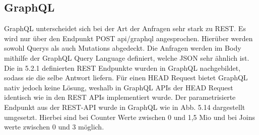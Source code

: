 
\subsection{GraphQL}
GraphQL unterscheidet sich bei der Art der Anfragen sehr stark zu REST. Es wird nur über den Endpunkt POST api/graphql angesprochen. Hierüber werden sowohl Querys als auch Mutations abgedeckt. Die Anfragen werden im Body mithilfe der GraphQL Query Language definiert, welche JSON sehr ähnlich ist. Die in 5.2.1 definierten REST Endpunkte wurden in GraphQL nachgebildet, sodass sie die selbe Antwort liefern. Für einen HEAD Request bietet GraphQL nativ jedoch keine Lösung, weshalb in GraphQL APIs der HEAD Request identisch wie in den REST APIs implementiert wurde.
Der parametrisierte Endpunkt aus der REST-API wurde in GraphQL wie in Abb. 5.14 dargestellt umgesetzt. Hierbei sind bei Counter Werte zwischen 0 und 1,5 Mio und bei Joins werte zwischen 0 und 3 möglich.

